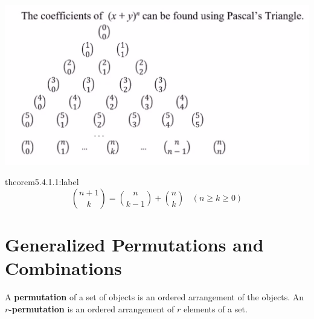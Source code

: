 \begin{center}
    \includegraphics[width=1\textwidth]{chapters/ch5/images/fig5.4.1.PNG}
\end{center}


\begin{theorem}{theorem5.4.1.1:label}
    \[
        \binom{n+1}{k} = \binom{n}{k-1} + \binom{n}{k} \:\:\:\: (n \ge k \ge 0)
    \]
\end{theorem}


\section{Generalized Permutations and Combinations}

\begin{definition}
    A \textbf{permutation} of a set of objects is an ordered arrangement of the objects. An \textbf{$r$-permutation} is an ordered arrangement of $r$ elements of a set. 
\end{definition}